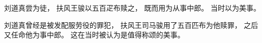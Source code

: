 
\switchcolumn*[\section{}]

刘道真尝为徒，
扶风王骏以五百疋布赎之，
既而用为从事中郎。
当时以为美事。

\switchcolumn


刘道真曾经是被发配服劳役的罪犯，
扶风王司马骏用了五百匹布为他赎罪，
之后又任命他为事中郎。
这在当时被认为是值得称颂的美事。

